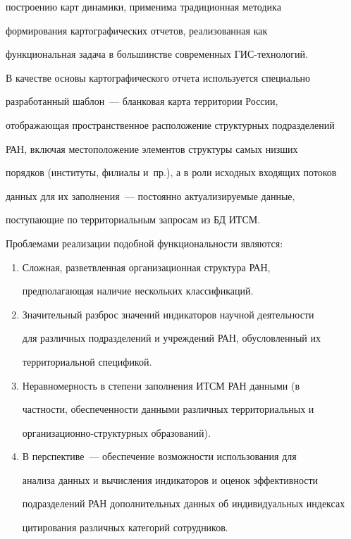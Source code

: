 построению карт динамики, применима традиционная методика 


формирования картографических отчетов, реализованная как 


функциональная задача в большинстве современных ГИС-технологий.


     


     В качестве основы картографического отчета используется специально 


разработанный шаблон~--- бланковая карта территории России, 


отображающая пространственное расположение структурных подразделений 


РАН, включая местоположение элементов структуры самых низших 


порядков (институты, филиалы и~пр.), а в роли исходных входящих потоков 


данных для их заполнения~--- постоянно актуализируемые данные, 


поступающие по территориальным запросам из БД ИТСМ. 


     


     Проблемами реализации подобной функциональности являются:


     \begin{enumerate}[1.]


     \item Сложная, разветвленная организационная структура РАН, 


предполагающая наличие нескольких классификаций.


\item Значительный разброс значений индикаторов научной деятельности  


для различных подразделений и учреждений РАН, обусловленный их 


территориальной спецификой.


     \item Неравномерность в степени заполнения ИТСМ РАН данными (в 


частности, обеспеченности данными различных территориальных и 


организационно-струк\-тур\-ных образований).


     \item В перспективе~--- обеспечение возможности использования для 


анализа данных и вычисления индикаторов и оценок эффективности 


подразделений РАН дополнительных данных об индивидуальных индексах 


цитирования различных категорий сотрудников.


     \end{enumerate}


